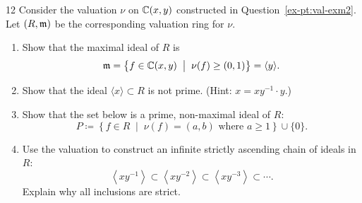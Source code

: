 \documentclass[Notebook.tex]{subfiles}
\begin{document}
    \begin{problem}{12}
        Consider the valuation $\nu$ on $\mathbb C(x,y)$ constructed in Question~\ref{ex-pt:val-exm2}. Let $(R,\operatorname{\mathfrak{m}})$ be the corresponding valuation ring for $\nu$.
        \begin{enumerate}[label=(\alph*),ref=\theenumi\alph*]
            \item Show that the maximal ideal of $R$ is
            \[
            \operatorname{\mathfrak{m}} = \left\{f \in \mathbb C(x,y) \;\; \big| \;\; \nu(f) \geq  (0, 1)\right\} = \langle y \rangle.
            \]
            \item Show that the ideal  $\langle x\rangle \subset R$ is not prime. (Hint: $x = xy^{-1}\cdot y$.)
            \item Show that the set below is a prime, non-maximal ideal of $R$:
            \[
            P \coloneqq \left \{ f \in R \;\; \big | \;\; \nu(f) = (a,b) \text{ where } a \geq 1 \right\}\cup\{0\}.
            \] 
            \item Use the valuation to construct an infinite strictly ascending chain of ideals in $R$:
            \[
            \left\langle xy^{-1} \right\rangle \subset \left\langle xy^{-2} \right\rangle \subset \left\langle xy^{-3}  \right\rangle \subset \cdots.
            \]
            Explain why all inclusions are strict.
        \end{enumerate}
    \end{problem}
\end{document}
